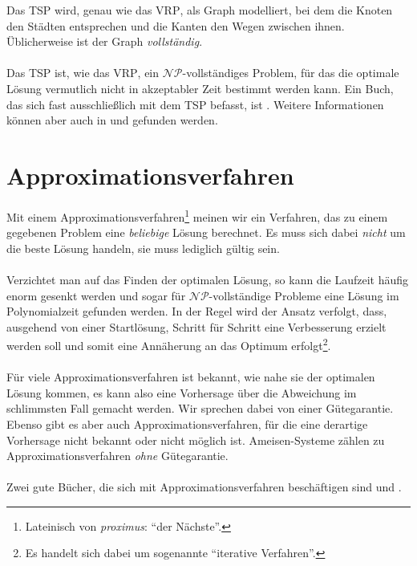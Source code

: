\noindent
Das \textsc{TSP} wird, genau wie das \textsc{VRP}, als Graph modelliert, bei dem die Knoten den Städten entsprechen und die Kanten den Wegen zwischen ihnen. Üblicherweise ist der Graph \emph{vollständig}. \\
\\
Das \textsc{TSP} ist, wie das \textsc{VRP}, ein $\mathcal{NP}$-vollständiges Problem, für das die optimale Lösung vermutlich nicht in akzeptabler Zeit bestimmt werden kann. Ein Buch, das sich fast ausschließlich mit dem \textsc{TSP} befasst, ist \cite{TSP}. Weitere Informationen können aber auch in \cite{GJ} und \cite{Wanka} gefunden werden.


\section{Approximationsverfahren}\label{chp:approx}
Mit einem Approximationsverfahren\footnote{Lateinisch von \emph{proximus}: ``der Nächste''.} meinen wir ein Verfahren, das zu einem gegebenen Problem eine \emph{beliebige} Lösung berechnet. Es muss sich dabei \emph{nicht} um die beste Lösung handeln, sie muss lediglich gültig sein. \\
\\
Verzichtet man auf das Finden der optimalen Lösung, so kann die Laufzeit häufig enorm gesenkt werden und sogar für $\mathcal{NP}$-vollständige Probleme eine Lösung im Polynomialzeit gefunden werden. In der Regel wird der Ansatz verfolgt, dass, ausgehend von einer Startlösung, Schritt für Schritt eine Verbesserung erzielt werden soll und somit eine Annäherung an das Optimum erfolgt\footnote{Es handelt sich dabei um sogenannte ``iterative Verfahren''.}. \\
\\
Für viele Approximationsverfahren ist bekannt, wie nahe sie der optimalen Lösung kommen, es kann also eine Vorhersage über die Abweichung im schlimmsten Fall gemacht werden. Wir sprechen dabei von einer Gütegarantie. Ebenso gibt es aber auch Approximationsverfahren, für die eine derartige Vorhersage nicht bekannt oder nicht möglich ist. Ameisen-Systeme zählen zu Approximationsverfahren \emph{ohne} Gütegarantie. \\
\\
Zwei gute Bücher, die sich mit Approximationsverfahren beschäftigen sind \cite{Vazirani} und \cite{Wanka}.

